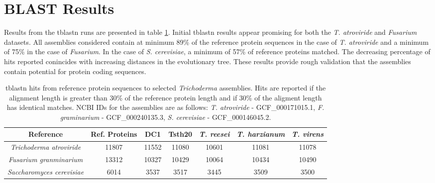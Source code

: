 \section{BLAST Results}
Results from the tblastn runs are presented in table
\ref{table:tblastn}. Initial tblastn results appear promising for both
the \textit{T. atroviride} and \textit{Fusarium} datasets. All
assemblies considered contain at minimum 89\% of the reference protein
sequences in the case of \textit{T. atroviride} and a minimum of 75\%
in the case of \textit{Fusarium}. In the case of
\textit{S. cerevisiae}, a minimum of 57\% of reference proteins
matched. The decreasing percentage of hits reported conincides with
increasing distances in the evolutionary tree. These results provide
rough validation that the assemblies contain potential for protein
coding sequences.


\begin{table}
  \centering
  \begin{tabular}{|c|c|c|c|c|c|c|}
    \hline
    Reference & Ref. Proteins & DC1 & Tsth20 & \textit{T. reesei} & \textit{T. harzianum} & \textit{T. virens}  \\ \hline
    \textit{Trichoderma atroviride} & 11807 & 11552 & 11080 & 10601 & 11081 & 11078 \\ \hline 
    \textit{Fusarium granminarium} & 13312 & 10327 & 10429 & 10064 & 10434 & 10490 \\ \hline
    \textit{Saccharomyces cerevisiae} & 6014 & 3537 & 3517 & 3445 & 3509 & 3500 \\ \hline
  \end{tabular}
  \caption{tblastn hits from reference protein sequences to selected
    \textit{Trichoderma} assemblies. Hits are reported if the
    alignment length is greater than 30\% of the reference protein
    length and if 30\% of the aligment length has identical
    matches. NCBI IDs for the assemblies are as follows:
    \textit{T. atroviride} - GCF\_000171015.1, \textit{F. graminarium}
    - GCF\_000240135.3, \textit{S. cerevisiae} - GCF\_000146045.2.}
  \label{table:tblastn}
\end{table}
